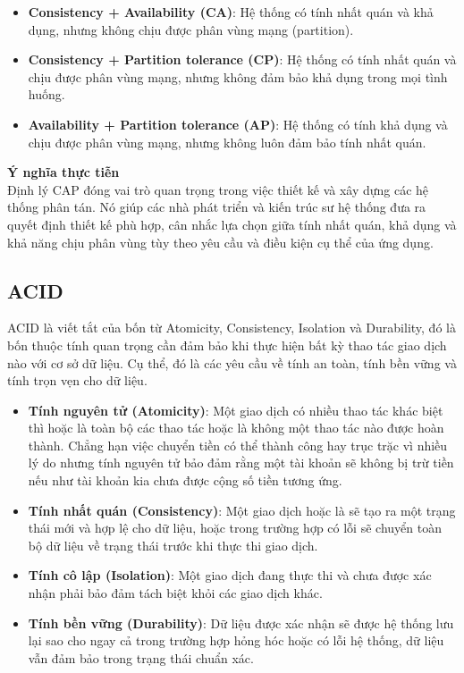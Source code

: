 \documentclass[../main.tex]{subfiles}
\begin{document}
\begin{itemize}
   \item \textbf{Consistency + Availability (CA)}: Hệ thống có tính nhất quán và khả dụng, nhưng không chịu được phân vùng mạng (partition).
   
   \item \textbf{Consistency + Partition tolerance (CP)}: Hệ thống có tính nhất quán và chịu được phân vùng mạng, nhưng không đảm bảo khả dụng trong mọi tình huống.
   
   \item \textbf{Availability + Partition tolerance (AP)}: Hệ thống có tính khả dụng và chịu được phân vùng mạng, nhưng không luôn đảm bảo tính nhất quán.
\end{itemize}

\textbf{Ý nghĩa thực tiễn}\\
Định lý CAP đóng vai trò quan trọng trong việc thiết kế và xây dựng các hệ thống phân tán. Nó giúp các nhà phát triển và kiến trúc sư hệ thống đưa ra quyết định thiết kế phù hợp, cân nhắc lựa chọn giữa tính nhất quán, khả dụng và khả năng chịu phân vùng tùy theo yêu cầu và điều kiện cụ thể của ứng dụng.
\subsection{ACID}
ACID là viết tắt của bốn từ Atomicity, Consistency, Isolation và Durability, đó là bốn thuộc tính quan trọng cần đảm bảo khi thực hiện bất kỳ thao tác giao dịch nào với cơ sở dữ liệu. Cụ thể, đó là các yêu cầu về tính an toàn, tính bền vững và tính trọn vẹn cho dữ liệu. 
\begin{itemize}
   \item \textbf{Tính nguyên tử (Atomicity)}: Một giao dịch có nhiều thao tác khác biệt thì hoặc là toàn bộ các thao tác hoặc là không một thao tác nào được hoàn thành. Chẳng hạn việc chuyển tiền có thể thành công hay trục trặc vì nhiều lý do nhưng tính nguyên tử bảo đảm rằng một tài khoản sẽ không bị trừ tiền nếu như tài khoản kia chưa được cộng số tiền tương ứng.
   
   \item \textbf{Tính nhất quán (Consistency)}: Một giao dịch hoặc là sẽ tạo ra một trạng thái mới và hợp lệ cho dữ liệu, hoặc trong trường hợp có lỗi sẽ chuyển toàn bộ dữ liệu về trạng thái trước khi thực thi giao dịch.
   
   \item \textbf{Tính cô lập (Isolation)}: Một giao dịch đang thực thi và chưa được xác nhận phải bảo đảm tách biệt khỏi các giao dịch khác.
   \item \textbf{Tính bền vững (Durability)}: Dữ liệu được xác nhận sẽ được hệ thống lưu lại sao cho ngay cả trong trường hợp hỏng hóc hoặc có lỗi hệ thống, dữ liệu vẫn đảm bảo trong trạng thái chuẩn xác.
\end{itemize}
\end{document}
